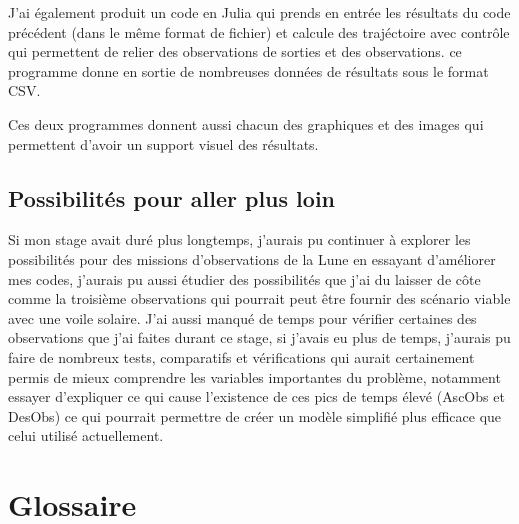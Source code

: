 \documentclass[12pt]{article} %
\begin{document}
		J'ai également produit un code en Julia qui prends en entrée les résultats du code précédent (dans le même format de fichier) et calcule des trajéctoire avec contrôle qui permettent de relier des observations de sorties et des observations. ce programme donne en sortie de nombreuses données de résultats sous le format CSV.
		
		Ces deux programmes donnent aussi chacun des graphiques et des images qui permettent d'avoir un support visuel des résultats.
		
		\subsection{Possibilités pour aller plus loin}
		Si mon stage avait duré plus longtemps, j'aurais pu continuer à explorer les possibilités pour des missions d'observations de la Lune en essayant d'améliorer mes codes, j'aurais pu aussi étudier des possibilités que j'ai du laisser de côte comme la troisième observations qui pourrait peut être fournir des scénario viable avec une voile solaire. J'ai aussi manqué de temps pour vérifier certaines des observations que j'ai faites durant ce stage, si j'avais eu plus de temps, j'aurais pu faire de nombreux tests, comparatifs et vérifications qui aurait certainement permis de mieux comprendre les variables importantes du problème, notamment essayer d'expliquer ce qui cause l'existence de ces pics de temps élevé (\gls{AscObs} et \gls{DesObs}) ce qui pourrait permettre de créer un modèle simplifié plus efficace que celui utilisé actuellement.
		
		\vfill
		
		\section{Glossaire}
		
		\printglossaries
		
		
\end{document}
